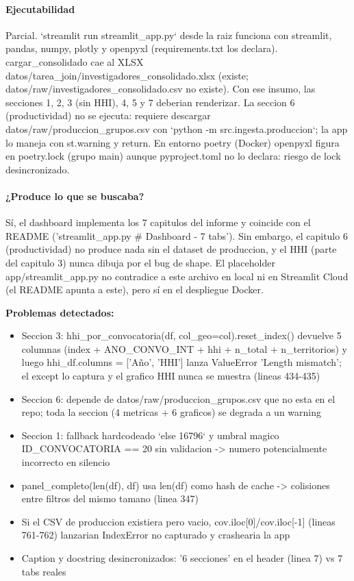 \paragraph{Ejecutabilidad}
Parcial. `streamlit run streamlit\_app.py` desde la raiz funciona con streamlit, pandas, numpy, plotly y openpyxl (requirements.txt los declara). cargar\_consolidado cae al XLSX datos/tarea\_join/investigadores\_consolidado.xlsx (existe; datos/raw/investigadores\_consolidado.csv no existe). Con ese insumo, las secciones 1, 2, 3 (sin HHI), 4, 5 y 7 deberian renderizar. La seccion 6 (productividad) no se ejecuta: requiere descargar datos/raw/produccion\_grupos.csv con `python -m src.ingesta.produccion`; la app lo maneja con st.warning y return. En entorno poetry (Docker) openpyxl figura en poetry.lock (grupo main) aunque pyproject.toml no lo declara: riesgo de lock desincronizado.

\paragraph{¿Produce lo que se buscaba?}
Sí, el dashboard implementa los 7 capitulos del informe y coincide con el README ('streamlit\_app.py \# Dashboard - 7 tabs'). Sin embargo, el capitulo 6 (productividad) no produce nada sin el dataset de produccion, y el HHI (parte del capitulo 3) nunca dibuja por el bug de shape. El placeholder app/streamlit\_app.py no contradice a este archivo en local ni en Streamlit Cloud (el README apunta a este), pero sí en el despliegue Docker.

\begin{tcolorbox}[riesgo]
\textbf{Problemas detectados:}
\begin{itemize}
  \item Seccion 3: hhi\_por\_convocatoria(df, col\_geo=col).reset\_index() devuelve 5 columnas (index + ANO\_CONVO\_INT + hhi + n\_total + n\_territorios) y luego hhi\_df.columns = ['Año', 'HHI'] lanza ValueError 'Length mismatch'; el except lo captura y el grafico HHI nunca se muestra (lineas 434-435)
  \item Seccion 6: depende de datos/raw/produccion\_grupos.csv que no esta en el repo; toda la seccion (4 metricas + 6 graficos) se degrada a un warning
  \item Seccion 1: fallback hardcodeado `else 16796` y umbral magico ID\_CONVOCATORIA == 20 sin validacion -> numero potencialmente incorrecto en silencio
  \item panel\_completo(len(df), df) usa len(df) como hash de cache -> colisiones entre filtros del mismo tamano (linea 347)
  \item Si el CSV de produccion existiera pero vacio, cov.iloc[0]/cov.iloc[-1] (lineas 761-762) lanzarian IndexError no capturado y crashearia la app
  \item Caption y docstring desincronizados: '6 secciones' en el header (linea 7) vs 7 tabs reales
\end{itemize}
\end{tcolorbox}

